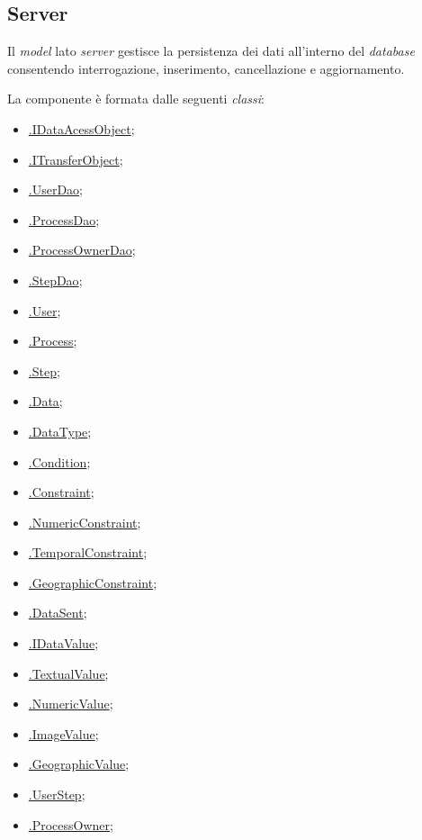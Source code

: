 \subsection{Server}

Il \textit{model} lato \textit{server} gestisce la persistenza dei dati all'interno del \textit{database} consentendo interrogazione, inserimento, cancellazione e aggiornamento.

La componente è formata dalle seguenti \textit{classi}:
\begin{itemize}
	\item \hyperref[idataacessobject]{\smodel{}.IDataAcessObject};
	\item \hyperref[itransferobject]{\smodel{}.ITransferObject};
	\item \hyperref[userdao]{\smodel{}.UserDao};
	\item \hyperref[processdao]{\smodel{}.ProcessDao};
	\item \hyperref[processownerdao]{\smodel{}.ProcessOwnerDao};
	\item \hyperref[stepdao]{\smodel{}.StepDao};
	\item \hyperref[botuser]{\smodel{}.User};
	\item \hyperref[botprocess]{\smodel{}.Process};
	\item \hyperref[botstep]{\smodel{}.Step};
	\item \hyperref[botdata]{\smodel{}.Data};
	\item \hyperref[botdatatype]{\smodel{}.DataType};
	\item \hyperref[botcondition]{\smodel{}.Condition};
	\item \hyperref[botconstraint]{\smodel{}.Constraint};
	\item \hyperref[botnumericconstraint]{\smodel{}.NumericConstraint};
	\item \hyperref[bottemporalconstraint]{\smodel{}.TemporalConstraint};
	\item \hyperref[botgeographicconstraint]{\smodel{}.GeographicConstraint};
	\item \hyperref[botdatasent]{\smodel{}.DataSent};
	\item \hyperref[botidatavalue]{\smodel{}.IDataValue};
	\item \hyperref[bottextualvalue]{\smodel{}.TextualValue};
	\item \hyperref[botnumericvalue]{\smodel{}.NumericValue};
	\item \hyperref[botimagevalue]{\smodel{}.ImageValue};
	\item \hyperref[botgeographicvalue]{\smodel{}.GeographicValue};
	\item \hyperref[botuserstep]{\smodel{}.UserStep};
	\item \hyperref[botpowner]{\smodel{}.ProcessOwner};
\end{itemize}

